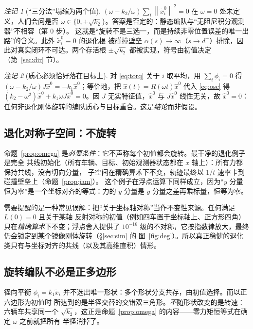 \documentclass[11pt,a4paper]{ctexart}
\theoremstyle{plain}
\theoremstyle{definition}
\theoremstyle{remark}
\newtheorem{remark}{注记}
\newcommand{\bx}{\widehat{x}}
\newcommand{\txi}{\tilde{x}}
\newcommand{\norm}[1]{\left\|#1\right\|}
\begin{document}
\begin{remark}[“三分法”塌缩为两个值]
$(\omega-k_2/\omega)\sum_i\norm{\txi_i^0}^2=0$ 在 $\omega=0$ 处未定义，人们会问是否
$\omega\in\{0,\pm\sqrt{k_2}\}$。答案是否定的：静态编队与“无阻尼积分观测器”不相容（第 0 步）。
这就是“旋转不是三选一，而是持续非零位置误差的唯一出路”的含义。此外 $\txi_i^0\equiv0$ 的退化根
被碰撞壁垒 $\alpha(s)\to\infty$（$s\to d^+$）排除，因此对真实闭环不可达。两个存活根
$\pm\sqrt{k_2}$ 都被实现，符号由初值决定（第~\ref{sec:dir} 节）。
\end{remark}

\begin{remark}[质心必须恰好落在目标上]
对 \eqref{eq:torq} 关于 $i$ 取平均，用 $\sum_i\phi_i=0$ 得
$(\omega-k_2/\omega)J\bx^0=-k_1\bx^0$；等价地，把 $\bx(t)=R(\omega t)\bx^0$ 代入 \eqref{eq:osc} 得
$(k_2-\omega^2)\bx^0+k_1\omega J\bx^0=0$。因 $J$ 无实特征值，$\bx^0$ 与 $J\bx^0$ 线性无关，故
$\bx^0=0$：任何非退化刚体旋转的编队质心与目标重合。这是\emph{结论}而非假设。
\end{remark}

\subsection{退化对称子空间：不旋转}
命题~\ref{prop:omega} 是\emph{必要条件}：它不声称每个初值都会旋转。最干净的退化例子是完全
共线初始化（所有车辆、目标、初始观测器状态都在 $x$ 轴上）：所有力都保持共线，没有切向分量，
子空间在精确算术下不变，轨迹最终以 $1/t$ 速率卡到碰撞壁垒上（命题~\ref{prop:jam}）。
这个例子在浮点运算下同样成立，因为“$y$ 分量恒为零”是一个坐标对齐的等式：力的 $y$ 分量是
$y$ 分量之差再乘标量，恒等为零。

需要提醒的是一种常见误解：把“关于坐标轴对称”当作不变性来源。任何满足 $L(0)=0$ 且关于某轴
反射对称的初值（例如四车置于坐标轴上、正方形四角）只在\emph{精确算术}下不变；浮点舍入提供了
$10^{-16}$ 级的不对称，它按指数律放大，最终仍会锁定到某个镜像刚体旋转（\S\ref{sec:sim} 的
图~\ref{fig:deg}）。所以真正稳健的退化类只有与坐标对齐的共线（以及其高维直积）情形。

\subsection{旋转编队不必是正多边形}
径向平衡 $\phi_i=k_1\txi_i$ 并不选出唯一形状：多个形状分支共存，由初值选择。而以正六边形为初值时
所达到的是半径交替的交错双三角形。\emph{不}随形状改变的是转速：六辆车共享同一个
$\sqrt{k_2}$，这正是命题~\ref{prop:omega} 的内容——零力矩恒等式在确定 $\omega$ 之前就把所有
半径消掉了。
\end{document}

